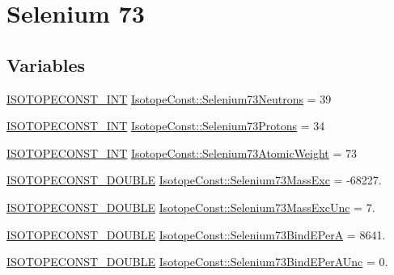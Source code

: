 \hypertarget{group___isotope_const-_selenium-_se73}{}\section{Selenium 73}
\label{group___isotope_const-_selenium-_se73}
\subsection*{Variables}
\begin{DoxyCompactItemize}
\item 
\mbox{\hyperlink{group___isotope_const-_macros_ga5f18360b3e99483a35c32d789e62621c}{I\+S\+O\+T\+O\+P\+E\+C\+O\+N\+S\+T\+\_\+\+I\+NT}} \mbox{\hyperlink{group___isotope_const-_selenium-_se73_ga42debdb894b43298ca719cca1743e03f}{Isotope\+Const\+::\+Selenium73\+Neutrons}} = 39
\item 
\mbox{\hyperlink{group___isotope_const-_macros_ga5f18360b3e99483a35c32d789e62621c}{I\+S\+O\+T\+O\+P\+E\+C\+O\+N\+S\+T\+\_\+\+I\+NT}} \mbox{\hyperlink{group___isotope_const-_selenium-_se73_gac38162c4a63394fbb18dab6606929e79}{Isotope\+Const\+::\+Selenium73\+Protons}} = 34
\item 
\mbox{\hyperlink{group___isotope_const-_macros_ga5f18360b3e99483a35c32d789e62621c}{I\+S\+O\+T\+O\+P\+E\+C\+O\+N\+S\+T\+\_\+\+I\+NT}} \mbox{\hyperlink{group___isotope_const-_selenium-_se73_gace93963ea7fa44bd673e5dbd6d89bbc6}{Isotope\+Const\+::\+Selenium73\+Atomic\+Weight}} = 73
\item 
\mbox{\hyperlink{group___isotope_const-_macros_ga8f45a7272ce02c0b4c65c44636ed719a}{I\+S\+O\+T\+O\+P\+E\+C\+O\+N\+S\+T\+\_\+\+D\+O\+U\+B\+LE}} \mbox{\hyperlink{group___isotope_const-_selenium-_se73_ga4b6a256f5e3c10b14b9d1fe890f30c79}{Isotope\+Const\+::\+Selenium73\+Mass\+Exc}} = -\/68227.
\item 
\mbox{\hyperlink{group___isotope_const-_macros_ga8f45a7272ce02c0b4c65c44636ed719a}{I\+S\+O\+T\+O\+P\+E\+C\+O\+N\+S\+T\+\_\+\+D\+O\+U\+B\+LE}} \mbox{\hyperlink{group___isotope_const-_selenium-_se73_gaf455e49a80a26a92962984a92e77f6ae}{Isotope\+Const\+::\+Selenium73\+Mass\+Exc\+Unc}} = 7.
\item 
\mbox{\hyperlink{group___isotope_const-_macros_ga8f45a7272ce02c0b4c65c44636ed719a}{I\+S\+O\+T\+O\+P\+E\+C\+O\+N\+S\+T\+\_\+\+D\+O\+U\+B\+LE}} \mbox{\hyperlink{group___isotope_const-_selenium-_se73_gaa1b535de9562abe16df781ebb6b35d82}{Isotope\+Const\+::\+Selenium73\+Bind\+E\+PerA}} = 8641.
\item 
\mbox{\hyperlink{group___isotope_const-_macros_ga8f45a7272ce02c0b4c65c44636ed719a}{I\+S\+O\+T\+O\+P\+E\+C\+O\+N\+S\+T\+\_\+\+D\+O\+U\+B\+LE}} \mbox{\hyperlink{group___isotope_const-_selenium-_se73_gaf292051162e9e9a2815c2b42bf415b19}{Isotope\+Const\+::\+Selenium73\+Bind\+E\+Per\+A\+Unc}} = 0.

\end{DoxyCompactItemize}
